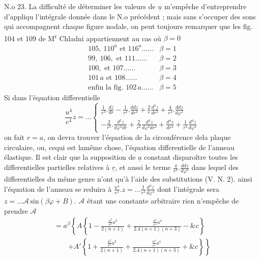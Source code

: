 \documentclass[11pt,a4paper]{article}
\begin{document}
N.o 23. La difficulté de déterminer les valeurs de $\underline{u}$ m'empêche
d'entreprendre d'appliqu  l'intégrale donnée
dans le N.o précédent ; mais sans s'occuper des sons qui accompagnent
chaque figure nodale, on peut toujours  remarquer que
les fig. 104 et 109 de M\textsuperscript{r} Chladni appartiennent au cas où $\beta = 0$
\[ \begin{array}{ll}
105,\ 110^a \text{ et } 116^a \ldots\ldots & \beta = 1 \\
99,\ 106, \text{ et } 111 \ldots\ldots & \beta = 2 \\
100, \text{ et } 107 \ldots\ldots & \beta = 3 \\
101\,a \text{ et } 108 \ldots\ldots & \beta = 4 \\
\text{enfin la fig. } 102\,a \ldots\ldots & \beta = 5
\end{array} \]
Si dans l'équation differentielle
\[ \frac{u^4}{e^4}z = \ldots \left\{\begin{array}{l} \frac{1}{r^3}.\frac{dz}{dr} - \frac{1}{r^2}.\frac{ddz}{dr^2} + \frac{2}{r}\frac{d^3z}{dr^3} + \frac{4}{r^4}.\frac{ddz}{d\varphi^2} \\ - \frac{2}{r^3}.\frac{d^3z}{d\varphi^2dr} + \frac{2}{r^2}\frac{d^4z}{d\varphi^2dr^2} + \frac{d^4z}{dr^4} + \frac{1}{r^4}\frac{d^4z}{d\varphi^4} \end{array}\right. \]
on fait $r = a$, on devra trouver l'équation  de la circonférence
dela plaque circulaire, ou, cequi est lamême chose, l'équation
differentielle de l'anneau élastique. Il est clair que la supposition
de $\underline{a}$ constant   disparoître toutes les differentielles
partielles relatives à $\underline{r}$, et aussi le terme $\frac{4}{r^4}.\frac{ddz}{d\varphi^2}$  dans
lequel des differentielles du même genre n'ont   qu'à
l'aide des substitutions (V. N. 2). ainsi l'équation de
l'anneau se reduira à $\frac{u^4}{e^4}.z = \ldots \frac{1}{r^4}\frac{d^4z}{d\varphi^4}$
dont l'intégrale sera $z = \ldots \mathcal{A}\,\text{sin}(\beta\varphi + B)$. $\mathcal{A}$ étant une
constante arbitraire  rien n'empêche de  prendre $\mathcal{A}$
\[ \begin{array}{l} = a^\beta\left\{A\left\{1 - \frac{\frac{u^2}{e^2}a^2}{2(n+1)} + \frac{\frac{u^4}{e^4}a^4}{2.4(n+1)(n+3)} - \&c\right\}\right. \\ \qquad \left. + A'\left\{1 + \frac{\frac{u^2}{e^2}a^2}{2(n+1)} + \frac{\frac{u^4}{e^4}a^4}{2.4(n+1)(n+3)} + \&c\right\}\right\} \end{array} \]
\end{document}
